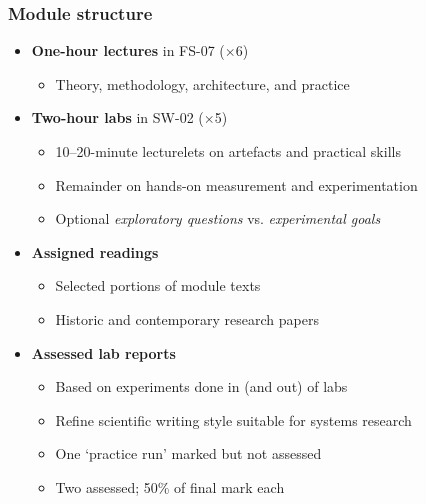 \begin{frame}
  \frametitle{Module structure}

  \begin{itemize}
    \item {\bf One-hour lectures} in FS-07 ($\times$6)
    \begin{itemize}
      \item Theory, methodology, architecture, and practice
    \end{itemize}

    \pause
    \bigskip
    \item {\bf Two-hour labs} in SW-02 ($\times$5)
    \begin{itemize}
      \item 10--20-minute lecturelets on artefacts and practical skills
      \item Remainder on hands-on measurement and experimentation
      \item Optional \textit{exploratory questions} vs. \textit{experimental
	goals}
    \end{itemize}

    \pause
    \bigskip
    \item {\bf Assigned readings}
    \begin{itemize}
      \item Selected portions of module texts
      \item Historic and contemporary research papers
    \end{itemize}

    \pause
    \bigskip
    \item {\bf Assessed lab reports}
    \begin{itemize}
      \item Based on experiments done in (and out) of labs
      \item Refine scientific writing style suitable for systems research
      \item One `practice run' marked but not assessed
      \item Two assessed; 50\% of final mark each
    \end{itemize}
  \end{itemize}
\end{frame}

